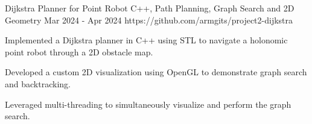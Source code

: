 \begin{project}
  {Dijkstra Planner for Point Robot}
  {C++, Path Planning, Graph Search and 2D Geometry}
  {Mar 2024 - Apr 2024}
  {https://github.com/armgits/project2-dijkstra}

  \item Implemented a Dijkstra planner in C++ using STL to navigate a holonomic point robot through
        a 2D obstacle map.

  \item Developed a custom 2D visualization using OpenGL to demonstrate graph search and
        backtracking.

  \item Leveraged multi-threading to simultaneously visualize and perform the graph search.

\end{project}
